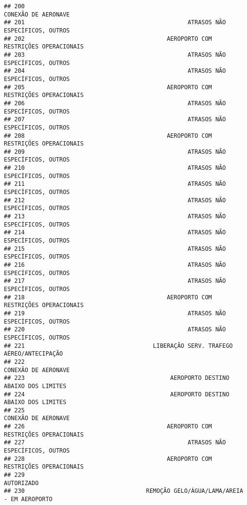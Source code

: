 \documentclass[
]{article}
\begin{document}
\begin{verbatim}
## 200                                                           CONEXÃO DE AERONAVE
## 201                                               ATRASOS NÃO ESPECÍFICOS, OUTROS
## 202                                         AEROPORTO COM RESTRIÇÕES OPERACIONAIS
## 203                                               ATRASOS NÃO ESPECÍFICOS, OUTROS
## 204                                               ATRASOS NÃO ESPECÍFICOS, OUTROS
## 205                                         AEROPORTO COM RESTRIÇÕES OPERACIONAIS
## 206                                               ATRASOS NÃO ESPECÍFICOS, OUTROS
## 207                                               ATRASOS NÃO ESPECÍFICOS, OUTROS
## 208                                         AEROPORTO COM RESTRIÇÕES OPERACIONAIS
## 209                                               ATRASOS NÃO ESPECÍFICOS, OUTROS
## 210                                               ATRASOS NÃO ESPECÍFICOS, OUTROS
## 211                                               ATRASOS NÃO ESPECÍFICOS, OUTROS
## 212                                               ATRASOS NÃO ESPECÍFICOS, OUTROS
## 213                                               ATRASOS NÃO ESPECÍFICOS, OUTROS
## 214                                               ATRASOS NÃO ESPECÍFICOS, OUTROS
## 215                                               ATRASOS NÃO ESPECÍFICOS, OUTROS
## 216                                               ATRASOS NÃO ESPECÍFICOS, OUTROS
## 217                                               ATRASOS NÃO ESPECÍFICOS, OUTROS
## 218                                         AEROPORTO COM RESTRIÇÕES OPERACIONAIS
## 219                                               ATRASOS NÃO ESPECÍFICOS, OUTROS
## 220                                               ATRASOS NÃO ESPECÍFICOS, OUTROS
## 221                                     LIBERAÇÃO SERV. TRAFEGO AÉREO/ANTECIPAÇÃO
## 222                                                           CONEXÃO DE AERONAVE
## 223                                          AEROPORTO DESTINO ABAIXO DOS LIMITES
## 224                                          AEROPORTO DESTINO ABAIXO DOS LIMITES
## 225                                                           CONEXÃO DE AERONAVE
## 226                                         AEROPORTO COM RESTRIÇÕES OPERACIONAIS
## 227                                               ATRASOS NÃO ESPECÍFICOS, OUTROS
## 228                                         AEROPORTO COM RESTRIÇÕES OPERACIONAIS
## 229                                                                    AUTORIZADO
## 230                                   REMOÇÃO GELO/ÁGUA/LAMA/AREIA - EM AEROPORTO

\end{verbatim}
\end{document}
